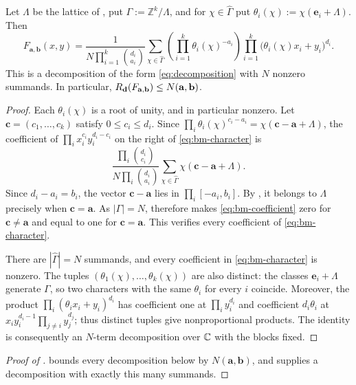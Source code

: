 \begin{proposition}\label{prop:bm-upper}
Let $\Lambda$ be the lattice of , put
$\Gamma:=\mathbb Z^k/\Lambda$, and for $\chi\in\widehat\Gamma$ put
$\theta_i(\chi):=\chi(\mathbf e_i+\Lambda)$. Then
\begin{equation}\label{eq:bm-character}
F_{\mathbf a,\mathbf b}(x,y)
=\frac{1}{N\prod_{i=1}^k\binom{d_i}{a_i}}
\sum_{\chi\in\widehat\Gamma}
\left(\prod_{i=1}^k\theta_i(\chi)^{-a_i}\right)
\prod_{i=1}^k\bigl(\theta_i(\chi)x_i+y_i\bigr)^{d_i}.
\end{equation}
This is a decomposition of the form \eqref{eq:decomposition} with $N$
nonzero summands. In particular,
$R_{\mathbf d}(F_{\mathbf a,\mathbf b})\le N(\mathbf a,\mathbf b)$.
\end{proposition}
\begin{proof}
Each $\theta_i(\chi)$ is a root of unity, and in particular nonzero.
Let $\mathbf c=(c_1,\ldots,c_k)$ satisfy $0\le c_i\le d_i$. Since
$\prod_i\theta_i(\chi)^{c_i-a_i}=\chi(\mathbf c-\mathbf a+\Lambda)$, the
coefficient of $\prod_ix_i^{c_i}y_i^{d_i-c_i}$ on the right of
\eqref{eq:bm-character} is
\begin{equation}\label{eq:bm-coefficient}
\frac{\prod_i\binom{d_i}{c_i}}{N\prod_i\binom{d_i}{a_i}}
\sum_{\chi\in\widehat\Gamma}\chi(\mathbf c-\mathbf a+\Lambda).
\end{equation}
Since $d_i-a_i=b_i$, the vector $\mathbf c-\mathbf a$ lies in
$\prod_i[-a_i,b_i]$. By , it belongs to
$\Lambda$ precisely when $\mathbf c=\mathbf a$. As $|\Gamma|=N$,
 therefore makes \eqref{eq:bm-coefficient}
zero for $\mathbf c\ne\mathbf a$ and equal to one for
$\mathbf c=\mathbf a$. This
verifies every coefficient of \eqref{eq:bm-character}.

There are $|\widehat\Gamma|=N$ summands, and every coefficient in
\eqref{eq:bm-character} is nonzero. The tuples
$(\theta_1(\chi),\ldots,\theta_k(\chi))$ are also distinct: the classes
$\mathbf e_i+\Lambda$ generate $\Gamma$, so two characters with the
same $\theta_i$ for every $i$ coincide. Moreover, the product
$\prod_i(\theta_ix_i+y_i)^{d_i}$ has coefficient one at
$\prod_iy_i^{d_i}$ and coefficient $d_i\theta_i$ at
$x_iy_i^{d_i-1}\prod_{j\ne i}y_j^{d_j}$; thus distinct tuples give
nonproportional products. The identity is consequently an $N$-term
decomposition over $\mathbb C$ with the blocks fixed.
\end{proof}

\begin{proof}[Proof of ]
 bounds every decomposition below by
$N(\mathbf a,\mathbf b)$, and  supplies a
decomposition with exactly this many summands.
\end{proof}

